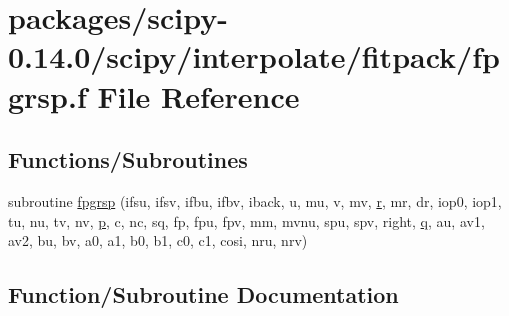 \hypertarget{fpgrsp_8f}{}\section{packages/scipy-\/0.14.0/scipy/interpolate/fitpack/fpgrsp.f File Reference}
\label{fpgrsp_8f}
\subsection*{Functions/\+Subroutines}
\begin{DoxyCompactItemize}
\item 
subroutine \hyperlink{fpgrsp_8f_aac376decc21a609427c4ff3f9c637c1e}{fpgrsp} (ifsu, ifsv, ifbu, ifbv, iback, u, mu, v, mv, \hyperlink{indexexpr_8h_ac434fd11cc2493608d8d91424d60c17e}{r}, mr, dr, iop0, iop1, tu, nu, tv, nv, \hyperlink{indexexpr_8h_a2b8c103eb5bfc196fbc3d29923e28ac1}{p}, c, nc, sq, fp, fpu, fpv, mm, mvnu, spu, spv, right, \hyperlink{indexexpr_8h_ac886c3584e464b5533390d7440c9dd98}{q}, au, av1, av2, bu, bv, a0, a1, b0, b1, c0, c1, cosi, nru, nrv)
\end{DoxyCompactItemize}


\subsection{Function/\+Subroutine Documentation}
\hypertarget{fpgrsp_8f_aac376decc21a609427c4ff3f9c637c1e}{}
